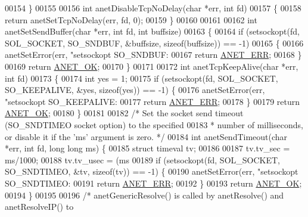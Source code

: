 \begin{DoxyCode}
{{{{{{{00154 \}
00155 
00156 \textcolor{keywordtype}{int} anetDisableTcpNoDelay(\textcolor{keywordtype}{char} *err, \textcolor{keywordtype}{int} fd)
00157 \{
00158     \textcolor{keywordflow}{return} anetSetTcpNoDelay(err, fd, 0);
00159 \}
00160 
00161 
00162 \textcolor{keywordtype}{int} anetSetSendBuffer(\textcolor{keywordtype}{char} *err, \textcolor{keywordtype}{int} fd, \textcolor{keywordtype}{int} buffsize)
00163 \{
00164     \textcolor{keywordflow}{if} (setsockopt(fd, SOL\_SOCKET, SO\_SNDBUF, &buffsize, \textcolor{keyword}{sizeof}(buffsize)) == -1)
00165     \{
00166         anetSetError(err, \textcolor{stringliteral}{"setsockopt SO\_SNDBUF: %
00167         \textcolor{keywordflow}{return} \hyperlink{anet_8h_a0697b7774a7e0f4ef141839fe93536fe}{ANET\_ERR};
00168     \}
00169     \textcolor{keywordflow}{return} \hyperlink{anet_8h_a25fb91ccc6457153f6d2e21380d4c6cf}{ANET\_OK};
00170 \}
00171 
00172 \textcolor{keywordtype}{int} anetTcpKeepAlive(\textcolor{keywordtype}{char} *err, \textcolor{keywordtype}{int} fd)
00173 \{
00174     \textcolor{keywordtype}{int} yes = 1;
00175     \textcolor{keywordflow}{if} (setsockopt(fd, SOL\_SOCKET, SO\_KEEPALIVE, &yes, \textcolor{keyword}{sizeof}(yes)) == -1) \{
00176         anetSetError(err, \textcolor{stringliteral}{"setsockopt SO\_KEEPALIVE: %
00177         \textcolor{keywordflow}{return} \hyperlink{anet_8h_a0697b7774a7e0f4ef141839fe93536fe}{ANET\_ERR};
00178     \}
00179     \textcolor{keywordflow}{return} \hyperlink{anet_8h_a25fb91ccc6457153f6d2e21380d4c6cf}{ANET\_OK};
00180 \}
00181 
00182 \textcolor{comment}{/* Set the socket send timeout (SO\_SNDTIMEO socket option) to the specified}
00183 \textcolor{comment}{ * number of milliseconds, or disable it if the 'ms' argument is zero. */}
00184 \textcolor{keywordtype}{int} anetSendTimeout(\textcolor{keywordtype}{char} *err, \textcolor{keywordtype}{int} fd, \textcolor{keywordtype}{long} \textcolor{keywordtype}{long} ms) \{
00185     \textcolor{keyword}{struct} timeval tv;
00186 
00187     tv.tv\_sec = ms/1000;
00188     tv.tv\_usec = (ms%
00189     \textcolor{keywordflow}{if} (setsockopt(fd, SOL\_SOCKET, SO\_SNDTIMEO, &tv, \textcolor{keyword}{sizeof}(tv)) == -1) \{
00190         anetSetError(err, \textcolor{stringliteral}{"setsockopt SO\_SNDTIMEO: %
00191         \textcolor{keywordflow}{return} \hyperlink{anet_8h_a0697b7774a7e0f4ef141839fe93536fe}{ANET\_ERR};
00192     \}
00193     \textcolor{keywordflow}{return} \hyperlink{anet_8h_a25fb91ccc6457153f6d2e21380d4c6cf}{ANET\_OK};
00194 \}
00195 
00196 \textcolor{comment}{/* anetGenericResolve() is called by anetResolve() and anetResolveIP() to}
}}}}}}}}}}
\end{DoxyCode}
